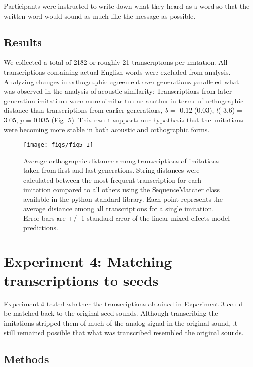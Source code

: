 \documentclass[10pt,letterpaper]{article}
\begin{document}
Participants were instructed to write down what they heard as a word so
that the written word would sound as much like the message as possible.

\subsection{Results}\label{results-2}

We collected a total of 2182 or roughly 21 transcriptions per imitation.
All transcriptions containing actual English words were excluded from
analysis. Analyzing changes in orthographic agreement over generations
paralleled what was observed in the analysis of acoustic similarity:
Transcriptions from later generation imitations were more similar to one
another in terms of orthographic distance than transcriptions from
earlier generations, \emph{b} = -0.12 (0.03), \emph{t}(-3.6) = 3.05,
\emph{p} = 0.035 (Fig. 5). This result supports our hypothesis that the
imitations were becoming more stable in both acoustic and orthographic
forms.

\begin{figure}
\texttt{[image: figs/fig5-1]} \caption{Average orthographic distance among transcriptions of imitations taken from first and last generations. String distances were calculated between the most frequent transcription for each imitation compared to all others using the SequenceMatcher class available in the python standard library. Each point represents the average distance among all transcriptions for a single imitation. Error bars are +/- 1 standard error of the linear mixed effects model predictions.}\label{fig:fig5}
\end{figure}

\section{Experiment 4: Matching transcriptions to
seeds}\label{experiment-4-matching-transcriptions-to-seeds}

Experiment 4 tested whether the transcriptions obtained in Experiment 3
could be matched back to the original seed sounds. Although transcribing
the imitations stripped them of much of the analog signal in the
original sound, it still remained possible that what was transcribed
resembled the original sounds.

\subsection{Methods}\label{methods-3}
\end{document}
